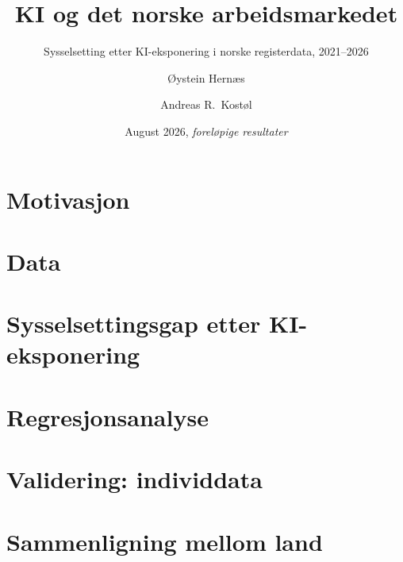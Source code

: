 \documentclass[aspectratio=169,11pt]{beamer}
\title{KI og det norske arbeidsmarkedet}
\subtitle{Sysselsetting etter KI-eksponering i norske registerdata, 2021--2026}
\author{Øystein Hernæs\inst{1} \and Andreas R.\ Kostøl\inst{2}}
\institute{\inst{1}Frischsenteret \and \inst{2}Handelshøyskolen BI}
\date{August 2026, \emph{foreløpige resultater}}
\begin{document}
\maketitle



\section{Motivasjon}


\section{Data}






\section{Sysselsettingsgap etter KI-eksponering}

\section{Regresjonsanalyse}


\section{Validering: individdata}


\section{Sammenligning mellom land}


\end{document}
